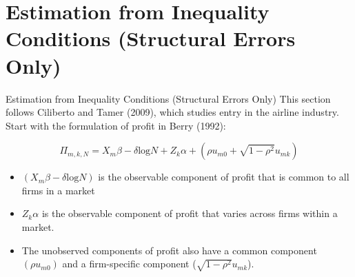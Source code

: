 \documentclass[xcolor=pdftex,dvipsnames,table,mathserif]{beamer}
\begin{document}
\section{Estimation from Inequality Conditions (Structural Errors Only)}

\begin{frame}{\normalsize Estimation from Inequality Conditions (Structural Errors Only)}
This section follows Ciliberto and Tamer (2009), which studies entry in the airline industry.\\
\vspace{0.1in}
Start with the  formulation of profit in Berry (1992):

\begin{equation*}
\Pi_{m,k,N} =X_{m} \beta - \delta \text{log} N + Z_k \alpha +  (\rho u_{m0} + \sqrt{1- \rho^2} u_{mk})
\end{equation*}

\begin{itemize}
\item $(X_{m} \beta - \delta \text{log} N) $ is the observable component of profit that is common to all firms in a market
\item $Z_k \alpha$ is the observable component of profit that varies across firms within a market. 
\item The unobserved components of profit also have a common component $(\rho u_{m0}) $ and a firm-specific component ($\sqrt{1- \rho^2} u_{mk}$).
\end{itemize}
\end{frame}
\end{document}
